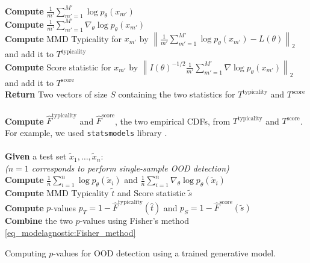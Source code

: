 {\begin{algorithm}[ht]
\begin{algorithmic}
\hspace{1.5em} \textbf{Compute} $\frac{1}{m'} \sum_{m'=1}^{M'}\log p_{\theta}({x}_{m'})$ \\
\hspace{1.5em} \textbf{Compute} $\frac{1}{m'} \sum_{m'=1}^{M'}\nabla_{{\theta}}\log p_{\theta}({x}_{m'})$ \\
\hspace{1.5em} \textbf{Compute} MMD Typicality for ${x}_{m'}$ by $\left\| \frac{1}{m'} \sum_{m'=1}^{M'}\log p_\theta ({x}_{m'}) - L(\theta) \right\|_2$ and add it to $T^{\text{typicality}}$\\
\hspace{1.5em} \textbf{Compute} Score statistic for ${x}_{m'}$ by $\left\|{I(\theta)}^{-1/2} \frac{1}{m'} \sum_{m'=1}^{M'}\nabla \log p_\theta ({x}_{m'})\right\|_2$ and add it to $T^{\text{score}}$\\
\textbf{Return} Two vectors of size $S$ containing the two statistics for $T^{\text{typicality}}$ and $T^{\text{score}}$  \\
\textbf{} \\
\textbf{Compute} $\hat{F}^{\text{typicality}}$ and $\hat{F}^{\text{score}}$, the two empirical CDFs, from $T^{\text{typicality}}$ and $T^{\text{score}}$. For example, we used \texttt{statsmodels} library \citep{seabold_statsmodels_2010}. \\
\textbf{} \\  
\textbf{Given} a test set $\tilde{x}_1, \dots, \tilde{x}_n$:\\
\textit{($n=1$ corresponds to perform single-sample OOD detection)} \\ 
\hspace{1.5em} \textbf{Compute} $\frac{1}{n} \sum_{i=1}^{n}\log p_{\theta}(\tilde{{x}}_i)$ and $\frac{1}{n} \sum_{i=1}^{n}\nabla_{{\theta}}\log p_{\theta}(\tilde{{x}}_i)$ \\
\hspace{1.5em} \textbf{Compute} MMD Typicality $\tilde{t}$ and Score statistic $\tilde{s}$ \\
\hspace{1.5em} \textbf{Compute} $p$-values $p_{T} = 1 - \hat{F}^{\text{typicality}}(\hat{t})$ and $p_{S} = 1 - \hat{F}^{\text{score}}(\tilde{s})$ \\
\hspace{1.5em} \textbf{Combine} the two $p$-values using Fisher's method \cref{eq_modelagnostic:Fisher_method}
\end{algorithmic}
\caption{Computing $p$-values for OOD detection using a trained generative model.}
\label{alg_modelagnostic:algo_description}
\end{algorithm}

}